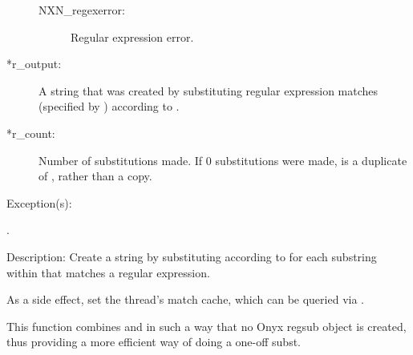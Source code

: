 \begin{capi}
\begin{capilist}
\begin{description}
\begin{description}
			\item[NXN\_regexerror: ] Regular expression error.
			\end{description}
		\item[*r\_output: ]
			A string that was created by substituting regular
			expression matches (specified by )
			according to .
		\item[*r\_count: ]
			Number of substitutions made.  If 0 substitutions were
			made,  is a duplicate of
			, rather than a copy.
		\end{description}
	\item[Exception(s): ]
		\begin{description}\item[]
		\item[.]
		\end{description}
	\item[Description: ]
		Create a string by substituting according to 
		for each substring within  that matches a regular
		expression.

		As a side effect, set the thread's match cache, which can be
		queried via .

		This function combines  and
		 in such a way that no Onyx regsub
		object is created, thus providing a more efficient way of doing
		a one-off subst.
	\end{capilist}
\end{capi}
